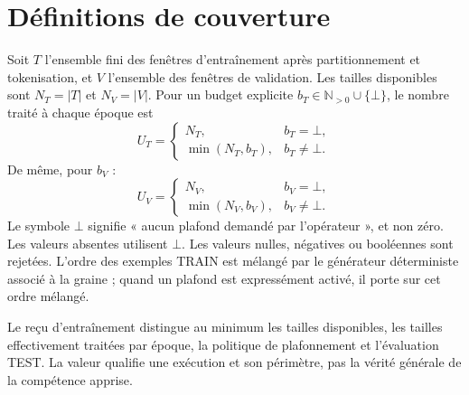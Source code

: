 \documentclass[11pt,a4paper]{article}
\begin{document}
\section{Définitions de couverture}
Soit $T$ l'ensemble fini des fenêtres d'entraînement après partitionnement et tokenisation, et $V$ l'ensemble des fenêtres de validation. Les tailles disponibles sont $N_T=|T|$ et $N_V=|V|$. Pour un budget explicite $b_T\in\mathbb{N}_{>0}\cup\{\bot\}$, le nombre traité à chaque époque est
\[
U_T=\begin{cases}N_T,&b_T=\bot,\\\min(N_T,b_T),&b_T\ne\bot.\end{cases}
\]
De même, pour $b_V$ :
\[
U_V=\begin{cases}N_V,&b_V=\bot,\\\min(N_V,b_V),&b_V\ne\bot.\end{cases}
\]
Le symbole $\bot$ signifie « aucun plafond demandé par l'opérateur », et non zéro. Les valeurs absentes utilisent $\bot$. Les valeurs nulles, négatives ou booléennes sont rejetées. L'ordre des exemples TRAIN est mélangé par le générateur déterministe associé à la graine ; quand un plafond est expressément activé, il porte sur cet ordre mélangé.

Le reçu d'entraînement distingue au minimum les tailles disponibles, les tailles effectivement traitées par époque, la politique de plafonnement et l'évaluation TEST. La valeur \texttt{} qualifie une exécution et son périmètre, pas la vérité générale de la compétence apprise.
\end{document}
